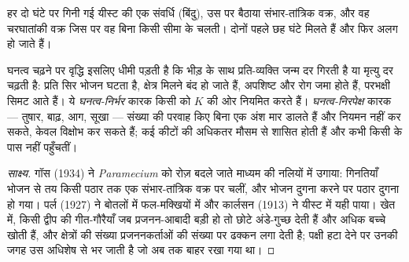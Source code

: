 \begin{omfigure}

{\small हर दो घंटे पर गिनी गई यीस्ट की एक संवर्धि (बिंदु), उस पर बैठाया
संभार-तांत्रिक वक्र, और वह चरघातांकी वक्र जिस पर वह बिना किसी सीमा के
चलती। दोनों पहले छह घंटे मिलते हैं और फिर अलग हो जाते हैं।}
\end{omfigure}

\begin{proposition}\label{prop:b1:populations:densitydependence}
घनत्व चढ़ने पर वृद्धि इसलिए धीमी पड़ती है कि भीड़ के साथ प्रति-व्यक्ति
जन्म दर गिरती है या मृत्यु दर चढ़ती है: प्रति सिर भोजन घटता है, क्षेत्र
मिलने बंद हो जाते हैं, अपशिष्ट और रोग जमा होते हैं, परभक्षी सिमट आते
हैं। ये \emph{घनत्व-निर्भर} कारक किसी  को $K$ की ओर नियमित करते
हैं। \emph{घनत्व-निरपेक्ष} कारक --- तुषार, बाढ़, आग, सूखा --- संख्या की
परवाह किए बिना एक अंश मार डालते हैं और नियमन नहीं कर सकते, केवल विक्षोभ
कर सकते हैं; कई कीटों की  अधिकतर मौसम से शासित होती हैं और कभी
किसी  के पास नहीं पहुँचतीं।
\end{proposition}
\begin{proof}[साक्ष्य]
गॉस (1934) ने \emph{Paramecium} को रोज़ बदले जाते माध्यम की नलियों में
उगाया: गिनतियाँ भोजन से तय किसी पठार तक एक संभार-तांत्रिक वक्र पर चलीं,
और भोजन दुगना करने पर पठार दुगना हो गया। पर्ल (1927) ने बोतलों में फल-मक्खियों
में और कार्लसन (1913) ने यीस्ट में यही पाया। खेत में, किसी द्वीप की
गीत-गौरैयाँ जब प्रजनन-आबादी बड़ी हो तो छोटे अंडे-गुच्छ देती हैं और अधिक
बच्चे खोती हैं, और क्षेत्रों की संख्या प्रजननकर्ताओं की संख्या पर ढक्कन
लगा देती है; पक्षी हटा देने पर उनकी जगह उस अधिशेष से भर जाती है जो अब तक
बाहर रखा गया था।
\end{proof}

